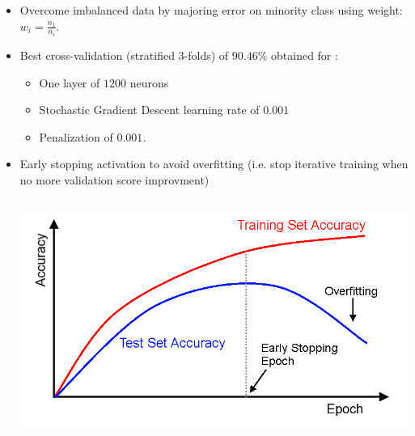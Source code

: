 \documentclass[c]{beamer}
\begin{document}
\begin{frame}
\begin{itemize}
 \item Overcome imbalanced data by majoring error on minority class using weight: $w_i=\frac{n_1}{n_i}$.
  \item Best cross-validation (stratified 3-folds) of $90.46$\% obtained for :
  {\scriptsize
  \begin{itemize}
    \item One layer of $1200$ neurons
    \item Stochastic Gradient Descent learning rate of $0.001$ 
    \item Penalization of $0.001$. 
    \end{itemize}
  }
  \item Early stopping activation to avoid overfitting (i.e. stop iterative training when no more validation score improvment)
  \begin{columns}
 \begin{column}{\textwidth}
  \begin{overlayarea}{\linewidth}{4cm}
    \centering\vfill
    \includegraphics[scale=0.15]{../4_classification/images/earlystopping.png}
  \end{overlayarea}
 \end{column}
 \end{columns}
 
 \end{itemize}
\end{frame}
\end{document}
